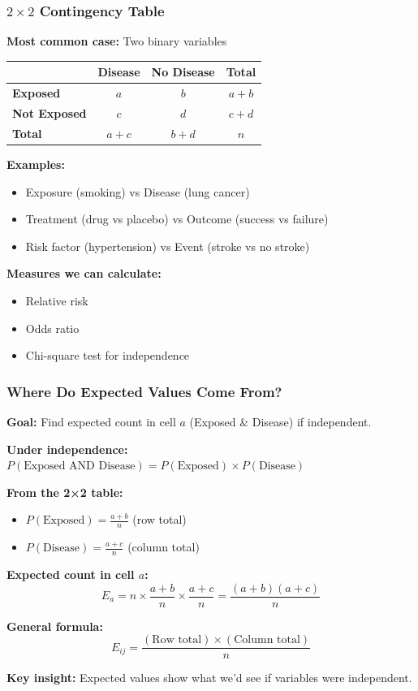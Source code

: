 \documentclass{beamer}
\begin{document}
\begin{frame}
\frametitle{$2 \times 2$ Contingency Table}
\textbf{Most common case:} Two binary variables

\vspace{0.3cm}
\begin{center}
\begin{tabular}{l|cc|c}
& \textbf{Disease} & \textbf{No Disease} & \textbf{Total} \\
\hline
\textbf{Exposed} & $a$ & $b$ & $a+b$ \\
\textbf{Not Exposed} & $c$ & $d$ & $c+d$ \\
\hline
\textbf{Total} & $a+c$ & $b+d$ & $n$ \\
\end{tabular}
\end{center}

\vspace{0.5cm}
\textbf{Examples:}
\begin{itemize}
\item Exposure (smoking) vs Disease (lung cancer)
\item Treatment (drug vs placebo) vs Outcome (success vs failure)
\item Risk factor (hypertension) vs Event (stroke vs no stroke)
\end{itemize}

\vspace{0.5cm}
\textbf{Measures we can calculate:}
\begin{itemize}
\item Relative risk
\item Odds ratio
\item Chi-square test for independence
\end{itemize}
\end{frame}

\begin{frame}
\frametitle{Where Do Expected Values Come From?}
\textbf{Goal:} Find expected count in cell $a$ (Exposed \& Disease) if independent.

\vspace{0.15cm}
\textbf{Under independence:} $P(\text{Exposed AND Disease}) = P(\text{Exposed}) \times P(\text{Disease})$

\vspace{0.15cm}
\textbf{From the 2×2 table:}
\begin{itemize}\setlength\itemsep{-0.1em}
\item $P(\text{Exposed}) = \frac{a+b}{n}$ (row total)
\item $P(\text{Disease}) = \frac{a+c}{n}$ (column total)
\end{itemize}

\vspace{0.15cm}
\textbf{Expected count in cell $a$:}
$$E_a = n \times \frac{a+b}{n} \times \frac{a+c}{n} = \frac{(a+b)(a+c)}{n}$$

\vspace{0.15cm}
\textbf{General formula:}
$$E_{ij} = \frac{(\text{Row total}) \times (\text{Column total})}{n}$$

\textbf{Key insight:} Expected values show what we'd see if variables were independent.
\end{frame}
\end{document}
